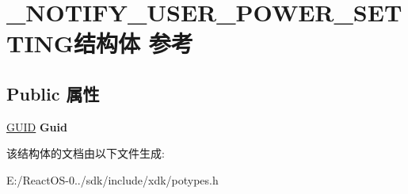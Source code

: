 \hypertarget{struct___n_o_t_i_f_y___u_s_e_r___p_o_w_e_r___s_e_t_t_i_n_g}{}\section{\+\_\+\+N\+O\+T\+I\+F\+Y\+\_\+\+U\+S\+E\+R\+\_\+\+P\+O\+W\+E\+R\+\_\+\+S\+E\+T\+T\+I\+N\+G结构体 参考}
\label{struct___n_o_t_i_f_y___u_s_e_r___p_o_w_e_r___s_e_t_t_i_n_g}
\subsection*{Public 属性}
\begin{DoxyCompactItemize}
\item 
\mbox{\label{struct___n_o_t_i_f_y___u_s_e_r___p_o_w_e_r___s_e_t_t_i_n_g_a9a5407a9f8e205a8a08cf2c589334303}} 
\hyperlink{interface_g_u_i_d}{G\+U\+ID} {\bfseries Guid}
\end{DoxyCompactItemize}


该结构体的文档由以下文件生成\+:\begin{DoxyCompactItemize}
\item 
E\+:/\+React\+O\+S-\/0../sdk/include/xdk/potypes.\+h\end{DoxyCompactItemize}
